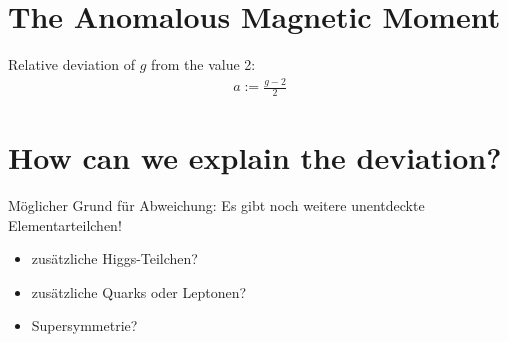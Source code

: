 \documentclass[12pt]{beamer}
\begin{document}

\section{The Anomalous Magnetic Moment}

\begin{frame}{\insertsection}
  Relative deviation of $g$ from the value 2:
  \begin{align*}
    a := \frac{g-2}{2}
  \end{align*}
\end{frame}


\section{How can we explain the deviation?}

\begin{frame}{\insertsection}
  Möglicher Grund für Abweichung: Es gibt noch weitere unentdeckte
  Elementarteilchen!
  \begin{itemize}
  \item zusätzliche Higgs-Teilchen?
  \item zusätzliche Quarks oder Leptonen?
  \item Supersymmetrie?
  \end{itemize}
\end{frame}
\end{document}
